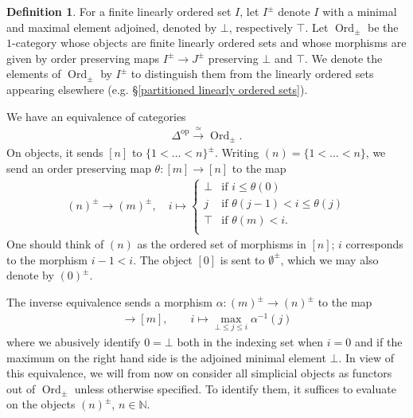 \documentclass[12pt, reqno]{amsart}
\theoremstyle{plain}
\theoremstyle{definition}
\newtheorem{definition}[theorem]{Definition}
\newcommand{\N}{\mathbb N}
\begin{document}
\begin{definition}
For a finite linearly ordered set $I$, let $I^\pm$ denote $I$ with a minimal and maximal element adjoined, denoted by $\bot$, respectively $\top$. Let $\operatorname{Ord}_\pm$ be the $1$-category whose objects are finite linearly ordered sets and whose morphisms are given by order preserving maps $I^\pm\rightarrow J^\pm$ preserving $\bot$ and $\top$. We denote the elements of $\operatorname{Ord}_\pm$ by $I^\pm$ to distinguish them from the linearly ordered sets appearing elsewhere (e.g. \S \ref{partitioned linearly ordered sets}).
\end{definition}

We have an equivalence of categories
\begin{align*}
\Delta^{\operatorname{op}}\xrightarrow{\ \simeq \ } \operatorname{Ord}_\pm.
\end{align*}
On objects, it sends $[n]$ to $\{1<\ldots <n\}^\pm$. Writing $(n)=\{1<\ldots <n\}$, we send an order preserving map $\theta\colon [m]\rightarrow [n]$ to the map
\begin{align*}
(n)^\pm \rightarrow (m)^\pm,\quad i\mapsto \begin{cases}
\bot & \text{if }i \leq \theta(0)\\
j & \text{if }\theta(j-1) < i\leq \theta(j) \\
\top & \text{if }\theta(m)<i.\\
\end{cases}
\end{align*}
One should think of $(n)$ as the ordered set of morphisms in $[n]$; $i$ corresponds to the morphism $i-1<i$. The object $[0]$ is sent to $\emptyset^\pm$, which we may also denote by $(0)^\pm$.

The inverse equivalence sends a morphism $\alpha\colon (m)^\pm \rightarrow (n)^\pm$ to the map
\begin{align*}
[n]\rightarrow [m],\qquad i\mapsto \mathop{\max}_{\bot\leq j\leq i} \alpha^{-1}(j)
\end{align*}
where we abusively identify $0=\bot$ both in the indexing set when $i=0$ and if the maximum on the right hand side is the adjoined minimal element $\bot$. In view of this equivalence, we will from now on consider all simplicial objects as functors out of $\operatorname{Ord}_\pm$ unless otherwise specified. To identify them, it suffices to evaluate on the objects $(n)^\pm$, $n\in \N$.
\end{document}
